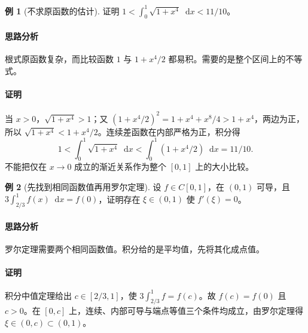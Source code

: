 \documentclass[UTF8,fontset=fandol,12pt,oneside,openany]{ctexrep}
\newcommand{\dd}{\mathop{}\!\mathrm d}
\theoremstyle{definition}
\newtheorem{example}{例}[chapter]
\begin{document}
\begin{example}[不求原函数的估计]
证明 $1<\int_0^1\sqrt{1+x^4}\dd x<11/10$。
\end{example}
\paragraph{思路分析} 根式原函数复杂，而比较函数 $1$ 与 $1+x^4/2$ 都易积。需要的是整个区间上的不等式。
\paragraph{证明} 当 $x>0$，$\sqrt{1+x^4}>1$；又 $(1+x^4/2)^2=1+x^4+x^8/4>1+x^4$，两边为正，所以 $\sqrt{1+x^4}<1+x^4/2$。连续差函数在内部严格为正，积分得
\[1<\int_0^1\sqrt{1+x^4}\dd x<\int_0^1(1+x^4/2)\dd x=11/10.\]
不能把仅在 $x\to0$ 成立的渐近关系作为整个 $[0,1]$ 上的大小比较。

\begin{example}[先找到相同函数值再用罗尔定理]
设 $f\in C[0,1]$，在 $(0,1)$ 可导，且 $3\int_{2/3}^1 f(x)\dd x=f(0)$，证明存在 $\xi\in(0,1)$ 使 $f'(\xi)=0$。
\end{example}
\paragraph{思路分析} 罗尔定理需要两个相同函数值。积分给的是平均值，先将其化成点值。
\paragraph{证明} 积分中值定理给出 $c\in[2/3,1]$，使 $3\int_{2/3}^1 f=f(c)$。故 $f(c)=f(0)$ 且 $c>0$。在 $[0,c]$ 上，连续、内部可导与端点等值三个条件均成立，由罗尔定理得 $\xi\in(0,c)\subset(0,1)$。
\end{document}
